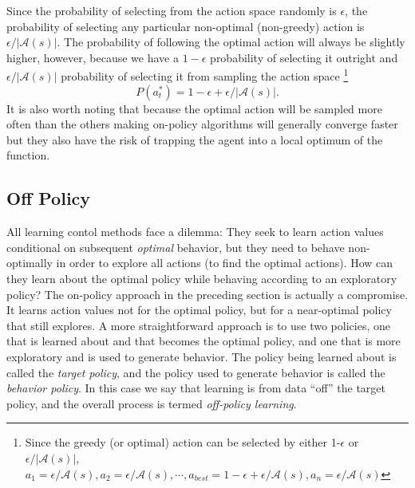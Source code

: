 Since the probability of selecting from the action space randomly is $\epsilon$, the probability of selecting any particular non-optimal (non-greedy) action is $\epsilon/|\mathcal{A}(s)|$. The probability of following the optimal action will always be slightly higher, however, because we have a $1 - \epsilon$ probability of selecting it outright and $\epsilon/ |\mathcal{A}(s)|$ probability of selecting it from sampling the action space \footnote{Since the greedy (or optimal) action can be selected by either 1-$\epsilon$ or $\epsilon/ |\mathcal{A}(s)|$, $a_1=\epsilon/\mathcal{A}(s),a_2=\epsilon/\mathcal{A}(s),\cdots,a_{best}=1-\epsilon+\epsilon/\mathcal{A}(s),a_n = \epsilon/\mathcal{A}(s)$}
$$P(a_t^{*}) = 1 - \epsilon+\epsilon/ |\mathcal{A}(s)|.$$
It is also worth noting that because the optimal action will be sampled more often than the others making on-policy algorithms will generally converge faster but they also have the risk of trapping the agent into a local optimum of the function.


\subsection{Off Policy}

All learning contol methods face a dilemma: They seek to learn action values conditional on subsequent \textit{optimal} behavior, but they need to behave non-optimally in order to explore all actions (to find the optimal actions). How can they learn about the optimal policy while behaving according to an exploratory policy? The on-policy approach in the preceding section is actually a compromise. It learns action values not for the optimal policy, but for a near-optimal policy that still explores. A more straightforward approach is to use two policies, one that is learned about and that becomes the optimal policy, and one that is more exploratory and is used to generate behavior. The policy being learned about is called the \textit{target policy}, and the policy used to generate behavior is called the \textit{behavior policy}. In this case we say that learning is from data ``off'' the target policy, and the overall process is termed \textit{off-policy learning}.

